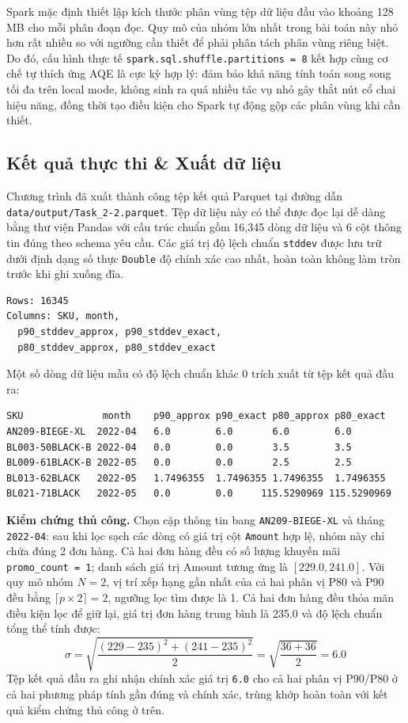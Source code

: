 Spark mặc định thiết lập kích thước phân vùng tệp dữ liệu đầu vào khoảng 128 MB cho mỗi phân đoạn đọc. Quy mô của nhóm lớn nhất trong bài toán này nhỏ hơn rất nhiều so với ngưỡng cần thiết để phải phân tách phân vùng riêng biệt. Do đó, cấu hình thực tế \texttt{spark.sql.shuffle.partitions = 8} kết hợp cùng cơ chế tự thích ứng AQE là cực kỳ hợp lý: đảm bảo khả năng tính toán song song tối đa trên local mode, không sinh ra quá nhiều tác vụ nhỏ gây thắt nút cổ chai hiệu năng, đồng thời tạo điều kiện cho Spark tự động gộp các phân vùng khi cần thiết.

\subsection{Kết quả thực thi \& Xuất dữ liệu}

Chương trình đã xuất thành công tệp kết quả Parquet tại đường dẫn \texttt{data/output/Task\_2-2.parquet}. Tệp dữ liệu này có thể được đọc lại dễ dàng bằng thư viện Pandas với cấu trúc chuẩn gồm 16,345 dòng dữ liệu và 6 cột thông tin đúng theo schema yêu cầu. Các giá trị độ lệch chuẩn \texttt{stddev} được lưu trữ dưới định dạng số thực \texttt{Double} độ chính xác cao nhất, hoàn toàn không làm tròn trước khi ghi xuống đĩa.

\begin{lstlisting}[language={}]
Rows: 16345
Columns: SKU, month,
  p90_stddev_approx, p90_stddev_exact,
  p80_stddev_approx, p80_stddev_exact
\end{lstlisting}

Một số dòng dữ liệu mẫu có độ lệch chuẩn khác 0 trích xuất từ tệp kết quả đầu ra:
\begin{lstlisting}[language={}]
SKU              month    p90_approx p90_exact p80_approx p80_exact
AN209-BIEGE-XL  2022-04   6.0        6.0       6.0        6.0
BL003-50BLACK-B 2022-04   0.0        0.0       3.5        3.5
BL009-61BLACK-B 2022-05   0.0        0.0       2.5        2.5
BL013-62BLACK   2022-05   1.7496355  1.7496355 1.7496355  1.7496355
BL021-71BLACK   2022-05   0.0        0.0     115.5290969 115.5290969
\end{lstlisting}

\textbf{Kiểm chứng thủ công.} Chọn cặp thông tin bang \texttt{AN209-BIEGE-XL} và tháng \texttt{2022-04}: sau khi lọc sạch các dòng có giá trị cột \texttt{Amount} hợp lệ, nhóm này chỉ chứa đúng 2 đơn hàng. Cả hai đơn hàng đều có số lượng khuyến mãi \texttt{promo\_count = 1}; danh sách giá trị Amount tương ứng là $[229.0, 241.0]$. Với quy mô nhóm $N = 2$, vị trí xếp hạng gần nhất của cả hai phân vị P80 và P90 đều bằng $\lceil p \times 2 \rceil = 2$, ngưỡng lọc tìm được là 1. Cả hai đơn hàng đều thỏa mãn điều kiện lọc để giữ lại, giá trị đơn hàng trung bình là 235.0 và độ lệch chuẩn tổng thể tính được:
\[
    \sigma = \sqrt{\frac{(229-235)^2 + (241-235)^2}{2}} = \sqrt{\frac{36+36}{2}} = 6.0
\]
Tệp kết quả đầu ra ghi nhận chính xác giá trị \texttt{6.0} cho cả hai phân vị P90/P80 ở cả hai phương pháp tính gần đúng và chính xác, trùng khớp hoàn toàn với kết quả kiểm chứng thủ công ở trên.

